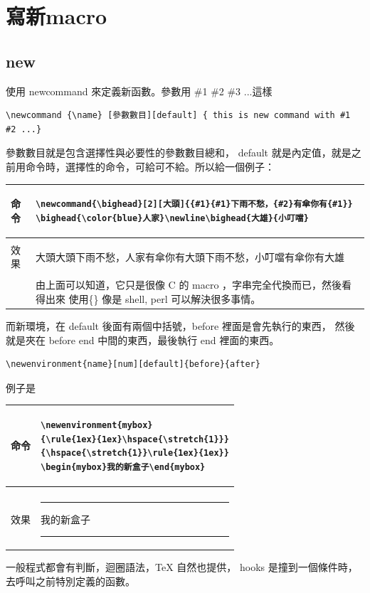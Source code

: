 \section{寫新macro}
\subsection{new}
使用 newcommand 來定義新函數。參數用 \#1 \#2 \#3 ...這樣
\begin{verbatim}
\newcommand {\name} [參數數目][default] { this is new command with #1 #2 ...}
\end{verbatim}
參數數目就是包含選擇性與必要性的參數數目總和，
default 就是內定值，就是之前用命令時，選擇性的命令，可給可不給。所以給一個例子：
\begin{flushleft}
\begin{tabular}{m{}|m{}}
命令 & 
\begin{verbatim}
\newcommand{\bighead}[2][大頭]{{#1}{#1}下雨不愁，{#2}有傘你有{#1}}
\bighead{\color{blue}人家}\newline\bighead{大雄}{小叮噹}
\end{verbatim}  \\
\hline \\[0.2cm]
效果 &
\newcommand{\bighead}[2][大頭]{{#1}{#1}下雨不愁，{#2}有傘你有{#1}}
\bighead{\color{blue}人家}\newline\bighead[大雄]{小叮噹} \\[0.2cm]
\hline \\[0.2cm]
&
由上面可以知道，它只是很像 C 的 macro ，字串完全代換而已，然後看得出來
使用\{\} 像是 shell, perl 可以解決很多事情。
\end{tabular}
\end{flushleft}
而新環境，在 default 後面有兩個中括號，before 裡面是會先執行的東西，
然後就是夾在 before end 中間的東西，最後執行 end 裡面的東西。
\begin{verbatim}
\newenvironment{name}[num][default]{before}{after}
\end{verbatim}
例子是
\begin{flushleft}
\begin{tabular}{m{}|m{}}
命令 & 
\begin{verbatim}
\newenvironment{mybox}
{\rule{1ex}{1ex}\hspace{\stretch{1}}}
{\hspace{\stretch{1}}\rule{1ex}{1ex}}
\begin{mybox}我的新盒子\end{mybox}
\end{verbatim}  \\
\hline \\[0.2cm]
效果 &
\newenvironment{mybox}
{\rule{1ex}{1ex}\hspace{\stretch{1}}}
{\hspace{\stretch{1}}\rule{1ex}{1ex}}
\begin{mybox}我的新盒子\end{mybox}
\end{tabular}
\end{flushleft}
一般程式都會有判斷，迴圈語法，\TeX{} 自然也提供，
hooks 是撞到一個條件時，去呼叫之前特別定義的函數。

